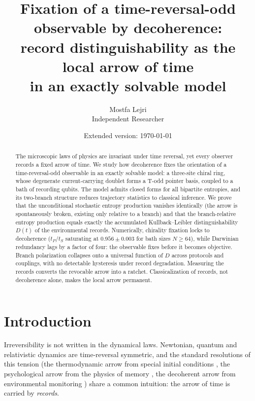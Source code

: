\documentclass[11pt]{article}
\title{\bfseries Fixation of a time-reversal-odd observable by decoherence:\\
record distinguishability as the local arrow of time\\
in an exactly solvable model}
\author{Mostfa Lejri\\[2pt]
\small Independent Researcher}
\date{\small Extended version: \today}
\begin{document}
\maketitle

\begin{abstract}
\noindent
The microscopic laws of physics are invariant under time reversal, yet every observer records a fixed arrow of time. We study how decoherence fixes the orientation of a time-reversal-odd observable in an exactly solvable model: a three-site chiral ring, whose degenerate current-carrying doublet forms a T-odd pointer basis, coupled to a bath of recording qubits. The model admits closed forms for all bipartite entropies, and its two-branch structure reduces trajectory statistics to classical inference. We prove that the unconditional stochastic entropy production vanishes identically (the arrow is spontaneously broken, existing only relative to a branch) and that the branch-relative entropy production equals exactly the accumulated Kullback--Leibler distinguishability $D(t)$ of the environmental records. Numerically, chirality fixation locks to decoherence ($t_P/t_S$ saturating at $0.956\pm0.003$ for bath sizes $N\ge64$), while Darwinian redundancy lags by a factor of four: the observable fixes before it becomes objective. Branch polarization collapses onto a universal function of $D$ across protocols and couplings, with no detectable hysteresis under record degradation. Measuring the records converts the revocable arrow into a ratchet. Classicalization of records, not decoherence alone, makes the local arrow permanent.
\end{abstract}

\tableofcontents

\section{Introduction}

Irreversibility is not written in the dynamical laws. Newtonian, quantum and relativistic dynamics are time-reversal symmetric, and the standard resolutions of this tension (the thermodynamic arrow from special initial conditions \cite{Albert2000}, the psychological arrow from the physics of memory \cite{Mlodinow2014}, the decoherent arrow from environmental monitoring \cite{Zeh2007,Zurek2003,Guff2025}) share a common intuition: the arrow of time is carried by \emph{records}.
\end{document}
